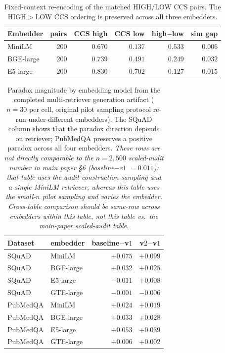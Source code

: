 \documentclass[11pt]{article}
\begin{document}
\begin{table}[!htb]
\centering
\caption{Fixed-context re-encoding of the matched HIGH/LOW CCS pairs.
The HIGH$>$LOW CCS ordering is preserved across all three embedders.}
\footnotesize
\begin{tabular}{lrrrrr}
\toprule
Embedder & pairs & CCS high & CCS low & high$-$low & sim gap \\
\midrule
MiniLM    & $200$ & $0.670$ & $0.137$ & $0.533$ & $0.006$ \\
BGE-large & $200$ & $0.739$ & $0.491$ & $0.249$ & $0.032$ \\
E5-large  & $200$ & $0.830$ & $0.702$ & $0.127$ & $0.015$ \\
\bottomrule
\end{tabular}
\end{table}

\begin{table}[!htb]
\centering
\caption{Paradox magnitude by embedding model from the completed
multi-retriever generation artifact ($n=30$ per cell, original pilot
sampling protocol re-run under different embedders). The SQuAD column
shows that the paradox direction depends on retriever; PubMedQA
preserves a positive paradox across all four embedders.
\textit{These rows are not directly comparable to the $n=2{,}500$
scaled-audit number in main paper \S6 (baseline$-$v$1$ $= 0.011$):
that table uses the audit-construction sampling and a single MiniLM
retriever, whereas this table uses the small-$n$ pilot sampling and
varies the embedder. Cross-table comparison should be same-row across
embedders within this table, not this table vs.\ the main-paper
scaled-audit table.}}
\footnotesize
\begin{tabular}{llrr}
\toprule
Dataset & embedder & baseline$-$v$1$ & v$2$$-$v$1$ \\
\midrule
SQuAD    & MiniLM    & $+0.075$ & $+0.099$ \\
SQuAD    & BGE-large & $+0.032$ & $+0.025$ \\
SQuAD    & E5-large  & $-0.011$ & $+0.008$ \\
SQuAD    & GTE-large & $-0.001$ & $-0.006$ \\
PubMedQA & MiniLM    & $+0.024$ & $+0.019$ \\
PubMedQA & BGE-large & $+0.033$ & $+0.028$ \\
PubMedQA & E5-large  & $+0.053$ & $+0.039$ \\
PubMedQA & GTE-large & $+0.006$ & $+0.002$ \\
\bottomrule
\end{tabular}
\end{table}
\end{document}
